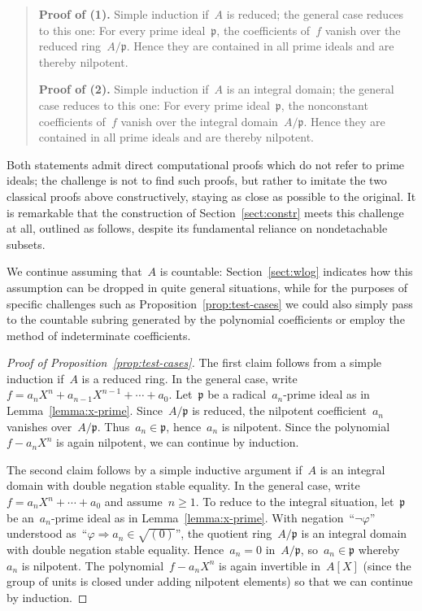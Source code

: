 \documentclass[com,11pt,crcready]{iosart2x}
\theoremstyle{definition}
\theoremstyle{plain}
\theoremstyle{remark}
\newcommand{\ppp}{\mathfrak{p}}
\renewcommand{\_}{\mathpunct{.}\,}
\begin{document}
\begin{quote}\small
  \textbf{Proof of (1).} Simple induction if~$A$ is
  reduced; the general case reduces to this one: For every prime ideal~$\ppp$,
  the coefficients of~$f$ vanish over the reduced ring~$A/\ppp$. Hence they are
  contained in all prime ideals and are thereby
  nilpotent.\medskip

  \textbf{Proof of (2).} Simple induction if~$A$ is an
  integral domain; the general case reduces to this one: For every prime
  ideal~$\ppp$, the nonconstant coefficients of~$f$ vanish over the integral
  domain~$A/\ppp$. Hence they are contained in all prime ideals
  and are thereby nilpotent.
\end{quote}

Both statements admit direct computational proofs which do not
refer to prime ideals; the challenge is not to find such proofs, but rather to
imitate the two classical proofs above constructively, staying as close as
possible to the original. It is remarkable that the construction of
Section~\ref{sect:constr} meets this challenge at all, outlined as follows, despite its fundamental
reliance on nondetachable subsets.

We continue assuming that~$A$ is countable:
Section~\ref{sect:wlog} indicates how this assumption can be dropped in quite
general situations, while for the purposes of specific challenges such as Proposition~\ref{prop:test-cases} we could also
simply pass to the countable subring generated by the polynomial coefficients
or employ the method of indeterminate coefficients.

\begin{proof}[Proof of Proposition~\ref{prop:test-cases}]
The first claim follows from a simple induction if~$A$ is a reduced
ring.
%
In the general case, write~$f = a_n X^n + a_{n-1} X^{n-1} + \cdots + a_0$. Let~$\ppp$
be a radical~$a_n$-prime ideal as in Lemma~\ref{lemma:x-prime}. Since~$A/\ppp$
is reduced, the nilpotent coefficient~$a_n$ vanishes over~$A/\ppp$. Thus~$a_n \in \ppp$,
hence~$a_n$ is nilpotent. Since the polynomial~$f - a_n X^n$ is again
nilpotent, we can continue by induction.

The second claim follows by a simple inductive argument if~$A$ is an
integral domain with double negation stable equality.
%
In the general case, write~$f = a_n X^n + \cdots + a_0$
and assume~$n \geq 1$. To reduce to the integral situation, let~$\ppp$ be
an~$a_n$-prime ideal as in Lemma~\ref{lemma:x-prime}.
With negation~``$\neg\varphi$'' understood as~``$\varphi \Rightarrow a_n \in
\sqrt{(0)}$'', the quotient ring~$A/\ppp$ is an integral domain with double
negation stable equality.
Hence~$a_n = 0$ in~$A/\ppp$, so~$a_n \in \ppp$ whereby~$a_n$ is nilpotent. The
polynomial~$f - a_n X^n$ is again invertible in~$A[X]$ (since the group of
units is closed under adding nilpotent elements) so that we can continue by
induction.
\end{proof}
\end{document}
